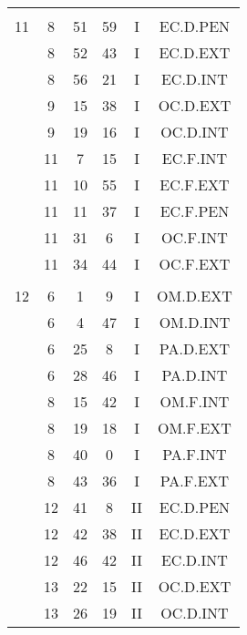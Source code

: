 \documentclass[12pt, a4paper]{article}
\begin{document}
\begin{multicols}{3}
{\begin{tabular}{c c c c c c}
	 	 	 	 & & & & & \\%
	 	 	 	11 & 8 & 51 & 59 & I & EC.D.PEN\\%
	 	 	 	 & 8 & 52 & 43 & I & EC.D.EXT\\%
	 	 	 	 & 8 & 56 & 21 & I & EC.D.INT\\%
	 	 	 	 & 9 & 15 & 38 & I & OC.D.EXT\\%
	 	 	 	 & 9 & 19 & 16 & I & OC.D.INT\\%
	 	 	 	 & 11 & 7 & 15 & I & EC.F.INT\\%
	 	 	 	 & 11 & 10 & 55 & I & EC.F.EXT\\%
	 	 	 	 & 11 & 11 & 37 & I & EC.F.PEN\\%
	 	 	 	 & 11 & 31 & 6 & I & OC.F.INT\\%
	 	 	 	 & 11 & 34 & 44 & I & OC.F.EXT\\%
	 	 	 	 & & & & & \\%
	 	 	 	12 & 6 & 1 & 9 & I & OM.D.EXT\\%
	 	 	 	 & 6 & 4 & 47 & I & OM.D.INT\\%
	 	 	 	 & 6 & 25 & 8 & I & PA.D.EXT\\%
	 	 	 	 & 6 & 28 & 46 & I & PA.D.INT\\%
	 	 	 	 & 8 & 15 & 42 & I & OM.F.INT\\%
	 	 	 	 & 8 & 19 & 18 & I & OM.F.EXT\\%
	 	 	 	 & 8 & 40 & 0 & I & PA.F.INT\\%
	 	 	 	 & 8 & 43 & 36 & I & PA.F.EXT\\%
	 	 	 	 & 12 & 41 & 8 & II & EC.D.PEN\\%
	 	 	 	 & 12 & 42 & 38 & II & EC.D.EXT\\%
	 	 	 	 & 12 & 46 & 42 & II & EC.D.INT\\%
	 	 	 	 & 13 & 22 & 15 & II & OC.D.EXT\\%
	 	 	 	 & 13 & 26 & 19 & II & OC.D.INT\\%
	 	 \end{tabular}
 	}
\end{multicols}
\end{document}
